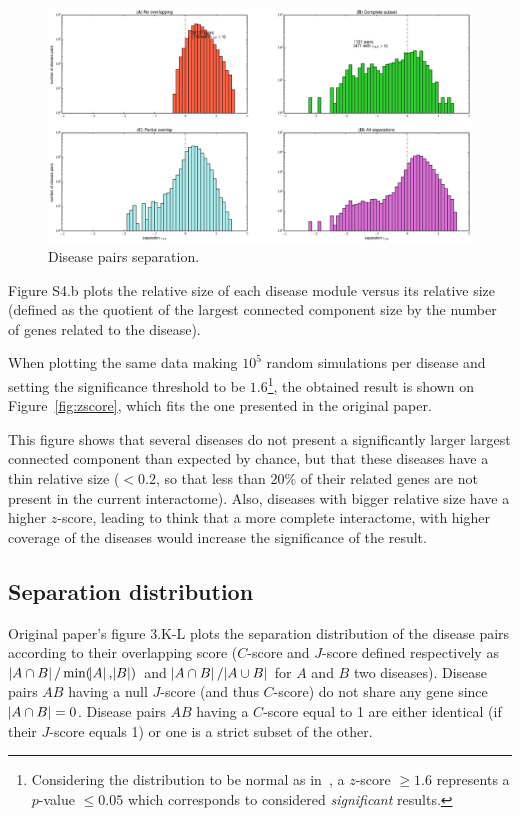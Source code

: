 \documentclass[letterpaper]{article}
\begin{document}
	\begin{figure}[!t]
		\hspace{-1.8cm}
		\vspace{-1cm}
		\includegraphics[scale=.35]{images/s_AB_histograms.eps}
		\caption{Disease pairs separation.\label{fig:s_AB histogram}}

	\end{figure}
	Figure S4.b plots the relative size of each disease module versus its relative size (defined as the
	quotient of the largest connected component size by the number of genes related to the disease).

	When plotting the same data making $10^5$ random simulations per disease and setting the significance
	threshold to be $1.6$\footnote{Considering the distribution to be normal as in~\cite{fluctuationGiantComponent},
	a $z$-score $\geq 1.6$ represents a $p$-value $\leq 0.05$ which corresponds to considered
	\textit{significant} results.}, the obtained result is shown on
	Figure~\ref{fig:zscore}, which fits the one presented in the original paper.

	This figure shows that several diseases do not present a significantly larger largest connected component
	than expected by chance, but that these diseases have a thin relative size ($< 0.2$, so that less than $20\%$
	of their related genes are not present in the current interactome). Also, diseases with bigger relative size
	have a higher $z$-score, leading to think that a more complete interactome, with higher coverage of the diseases
	would increase the significance of the result.

	\subsection{Separation distribution}
	Original paper's figure 3.K-L plots the separation distribution of the disease pairs according to their
	overlapping score ($C$-score and $J$-score defined respectively as $\abs {A \cap B}/\min(\abs A, \abs B)$ and
	$\abs {A \cap B}/\abs {A \cup B}$ for $A$ and $B$ two diseases). Disease pairs $AB$ having a null $J$-score
	(and thus $C$-score) do not share any gene since $\abs {A \cap B} = 0$. Disease pairs $AB$ having a $C$-score
	equal to 1 are either identical (if their $J$-score equals 1) or one is a strict subset of the other.
\end{document}
